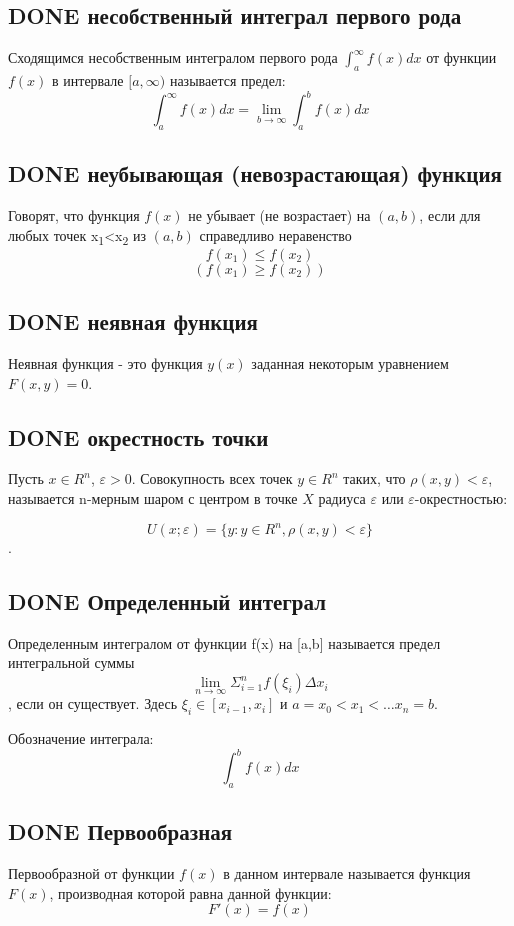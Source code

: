\documentclass[11pt]{article}
\begin{document}
\subsection{{\bfseries\sffamily DONE} несобственный интеграл первого рода}
\label{sec:org814b3c8}
Сходящимся несобственным интегралом первого рода \(\int_{a}^{\infty}f(x)dx\) от функции \(f(x)\) в интервале \([a,\infty)\) называется предел:
$$\int_{a}^{\infty}f(x)dx=\lim\limits_{b→\infty}\int_{a}^{b}f(x)dx$$
\subsection{{\bfseries\sffamily DONE} неубывающая (невозрастающая) функция}
\label{sec:org52bd67a}
Говорят, что функция \(f(x)\) не убывает (не возрастает) на \((a,b)\), если для любых точек x\textsubscript{1}<x\textsubscript{2} из \((a,b)\) справедливо неравенство
$$f(x_1)\leq f(x_2)$$
$$(f(x_1)\geq f(x_2))$$
\subsection{{\bfseries\sffamily DONE} неявная функция}
\label{sec:orga100d9c}
Неявная функция - это функция \(y(x)\) заданная некоторым уравнением \(F(x,y)=0\).
\subsection{{\bfseries\sffamily DONE} окрестность точки}
\label{sec:org22e0283}
Пусть \(x\in R^n\), \(\varepsilon >0\). Совокупность всех точек \(y\in R^n\) таких, что \(\rho(x,y)<\varepsilon\), называется n-мерным шаром с центром в точке \(X\) радиуса \(\varepsilon\) или \(\varepsilon\)-окрестностью:

$$U(x;\varepsilon)=\{y: y\in R^n,\rho(x,y)<\varepsilon\}$$.
\subsection{{\bfseries\sffamily DONE} Определенный интеграл}
\label{sec:org887dd5b}
Определенным интегралом от функции f(x) на [a,b] называется предел интегральной суммы
$$\lim\limits_{n\to\infty}\Sigma_{i=1}^{n}f(\xi_i)\Delta x_i$$,
если он существует. Здесь \(\xi_i\in[x_{i−1},x_i]\) и \(a=x_0<x_1<…x_n=b\).

Обозначение интеграла:
 $$\int_{a}^{b}f(x)dx$$
\subsection{{\bfseries\sffamily DONE} Первообразная}
\label{sec:orgb1ab558}
Первообразной от функции \(f(x)\) в данном интервале называется функция \(F(x)\), производная которой равна данной функции:
$$F'(x)=f(x)$$
\end{document}

